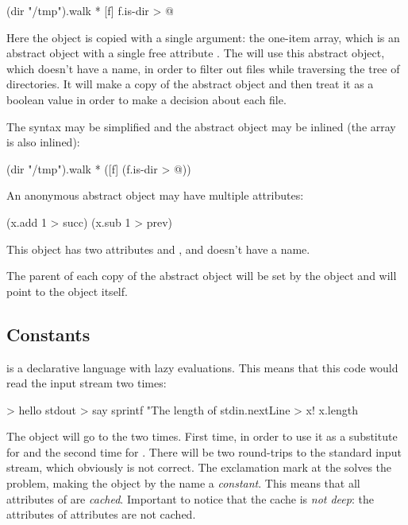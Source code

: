 \begin{ffcode}
(dir "/tmp").walk
  *
    [f]
      f.is-dir > @
\end{ffcode}

Here the object  is copied with a single argument:
the one-item array, which is an
abstract object with a single free attribute . The 
will use this abstract object, which doesn't have a name, in order
to filter out files while traversing the tree of directories. It will
make a copy of the abstract object and then treat it as a boolean
value in order to make a decision about each file.

The syntax may be simplified and the abstract object may be inlined
(the array is also inlined):

\begin{ffcode}
(dir "/tmp").walk
  * ([f] (f.is-dir > @))
\end{ffcode}

An anonymous abstract object may have multiple attributes:

\begin{ffcode}
[x] (x.add 1 > succ) (x.sub 1 > prev)
\end{ffcode}

This object has two attributes  and , and doesn't
have a name.

The parent of each copy of the abstract object will be set by
the object  and will point to the  object itself.

\subsection{Constants}

\eo{} is a declarative language with lazy evaluations. This means
that this code would read the input stream two times:

\begin{ffcode}
[] > hello
  stdout > say
    sprintf
      "The length of %
      stdin.nextLine > x!
      x.length
\end{ffcode}

The  object will go to the  two times. First time,
in order to use it as a substitute for  and the second time for
. There will be two round-trips to the standard input stream, which
obviously is not correct. The exclamation mark at the  solves the
problem, making the object by the name  a \emph{constant}. This means
that all attributes of  are \emph{cached}. Important to notice
that the cache is \emph{not deep}: the attributes of attributes are not cached.

